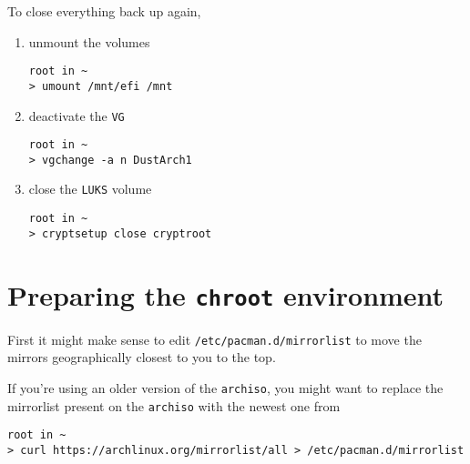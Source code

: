 \documentclass[10pt]{dustdoc}
\begin{document}
To close everything back up again,

\begin{enumerate}
    \item unmount the volumes

        \begin{verbatim}
root in ~
> umount /mnt/efi /mnt
        \end{verbatim}

    \item deactivate the \texttt{VG}

        \begin{verbatim}
root in ~
> vgchange -a n DustArch1
        \end{verbatim}

    \item close the \texttt{LUKS} volume

        \begin{verbatim}
root in ~
> cryptsetup close cryptroot
        \end{verbatim}
\end{enumerate}

\section{Preparing the \texttt{chroot} environment}%
\label{sec:preparing-the-chroot-environment}

First it might make sense to edit \texttt{/etc/pacman.d/mirrorlist} to move the mirrors geographically closest to you to the top.

If you're using an older version of the \texttt{archiso}, you might want to replace the mirrorlist present on the \texttt{archiso} with the newest one from 

\begin{verbatim}
root in ~
> curl https://archlinux.org/mirrorlist/all > /etc/pacman.d/mirrorlist
\end{verbatim}
\end{document}

